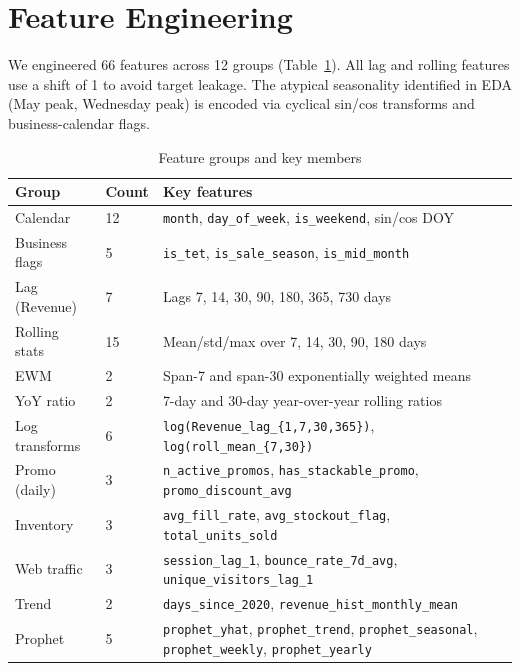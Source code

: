\documentclass{article}
\begin{document}

\section{Feature Engineering}

We engineered 66 features across 12 groups (Table~\ref{tab:features}). All lag and rolling features use a shift of 1 to avoid target leakage. The atypical seasonality identified in EDA (May peak, Wednesday peak) is encoded via cyclical sin/cos transforms and business-calendar flags.

\begin{table}[h]
\centering
\caption{Feature groups and key members}
\label{tab:features}
\small
\begin{tabular}{lll}
\toprule
\textbf{Group} & \textbf{Count} & \textbf{Key features} \\
\midrule
Calendar       & 12 & \texttt{month}, \texttt{day\_of\_week}, \texttt{is\_weekend}, sin/cos DOY \\
Business flags &  5 & \texttt{is\_tet}, \texttt{is\_sale\_season}, \texttt{is\_mid\_month} \\
Lag (Revenue)  &  7 & Lags 7, 14, 30, 90, 180, 365, 730 days \\
Rolling stats  & 15 & Mean/std/max over 7, 14, 30, 90, 180 days \\
EWM            &  2 & Span-7 and span-30 exponentially weighted means \\
YoY ratio      &  2 & 7-day and 30-day year-over-year rolling ratios \\
Log transforms &  6 & \texttt{log(Revenue\_lag\_\{1,7,30,365\})}, \texttt{log(roll\_mean\_\{7,30\})} \\
Promo (daily)  &  3 & \texttt{n\_active\_promos}, \texttt{has\_stackable\_promo}, \texttt{promo\_discount\_avg} \\
Inventory      &  3 & \texttt{avg\_fill\_rate}, \texttt{avg\_stockout\_flag}, \texttt{total\_units\_sold} \\
Web traffic    &  3 & \texttt{session\_lag\_1}, \texttt{bounce\_rate\_7d\_avg}, \texttt{unique\_visitors\_lag\_1} \\
Trend          &  2 & \texttt{days\_since\_2020}, \texttt{revenue\_hist\_monthly\_mean} \\
Prophet        &  5 & \texttt{prophet\_yhat}, \texttt{prophet\_trend}, \texttt{prophet\_seasonal}, \texttt{prophet\_weekly}, \texttt{prophet\_yearly} \\
\bottomrule
\end{tabular}
\end{table}
\end{document}
